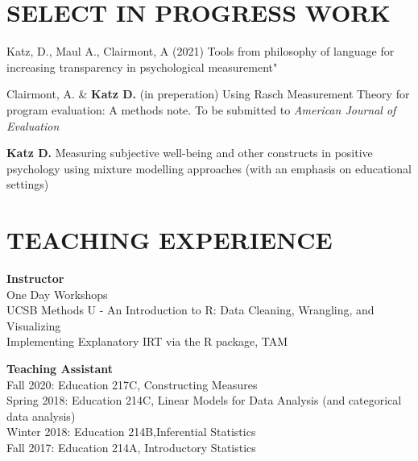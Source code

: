 \documentclass[12pt, oneside,]{memoir}
\begin{document}
\hypertarget{select-in-progress-work}{%
\section{SELECT IN PROGRESS WORK}\label{select-in-progress-work}}
\begin{hangparas}{.25in}{1}

Katz, D., Maul A., Clairmont, A (2021) Tools from philosophy of language
for increasing transparency in psychological measurement"

\noindent Clairmont, A. \& \textbf{Katz D.} (in preperation) Using Rasch
Measurement Theory for program evaluation: A methods note. To be
submitted to \emph{American Journal of Evaluation}

\noindent \textbf{Katz D.} Measuring subjective well-being and other constructs in
positive psychology using mixture modelling approaches (with an
emphasis on educational settings)
\end{hangparas}
\vspace{4mm}

\hypertarget{teaching-experience}{%
\section{TEACHING EXPERIENCE}\label{teaching-experience}}

\noindent\textbf{Instructor}\\
\noindent One Day Workshops\\
\hspace*{0.333em}\hspace*{0.333em}UCSB Methods U - An Introduction to R: Data Cleaning, Wrangling, and Visualizing\\
\hspace*{0.333em}\hspace*{0.333em}Implementing Explanatory IRT via the R package, TAM
\vspace{4mm}

\noindent \textbf{Teaching Assistant}\\
\hspace*{0.333em}\hspace*{0.333em}Fall 2020: Education 217C, Constructing Measures\\
\hspace*{0.333em}\hspace*{0.333em}Spring 2018: Education 214C, Linear Models for Data Analysis (and categorical data analysis)\\
\hspace*{0.333em}\hspace*{0.333em}Winter 2018: Education 214B,Inferential Statistics\\
\hspace*{0.333em}\hspace*{0.333em}Fall 2017: Education 214A, Introductory Statistics
\vspace{4mm}
\end{document}
